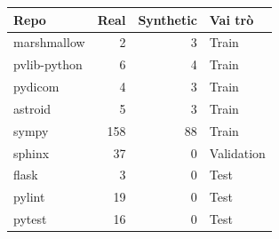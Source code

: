 \begin{tabular}{lrrl}\toprule
Repo & Real & Synthetic & Vai trò\\\midrule
marshmallow & 2 & 3 & Train\\
pvlib-python & 6 & 4 & Train\\
pydicom & 4 & 3 & Train\\
astroid & 5 & 3 & Train\\
sympy & 158 & 88 & Train\\
sphinx & 37 & 0 & Validation\\
flask & 3 & 0 & Test\\
pylint & 19 & 0 & Test\\
pytest & 16 & 0 & Test\\
\bottomrule\end{tabular}